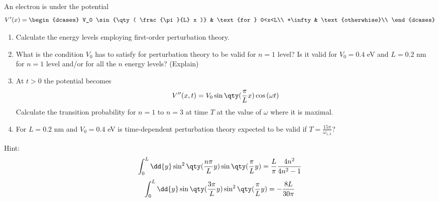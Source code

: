 \newpage
\setcounter{equation}{0}

\begin{esercizio}
   An electron is under the potential
   \begin{equation*}
      V'(x)=
      \begin{dcases}
         V_0 \sin{\qty( \frac{\pi}{L} x )} & \text{for } 0<x<L\\
         +\infty & \text{otherwhise}\\
      \end{dcases}
   \end{equation*}
   \begin{enumerate}[label=\alph*), leftmargin=0.6cm]
      \item Calculate the energy levels employing first-order perturbation theory.
      \item What is the condition $V_0$ has to satisfy for perturbation theory to be valid for $n=1$ level? Is it valid for $V_0=0.4$ eV and $L=0.2$ nm for $n=1$ level and/or for all the $n$ energy levels? (Explain)
      \item At $t>0$ the potential becomes
      \begin{equation*}
         V''(x,t)=V_0 \sin{\qty( \frac{\pi}{L} x )}\cos{(\omega t)}
      \end{equation*}
      Calculate the transition probability for $n=1$ to $n=3$ at time $T$ at the value of $\omega$ where it is maximal.
      \item For $L=0.2$ nm and $V_0=0.4$ eV is time-dependent perturbation theory expected to be valid if $T=\frac{15 \pi}{\omega_{1,3}}$?
   \end{enumerate}
   Hint:
   \begin{gather*}
      \int_{0}^{L} \dd{y} \sin^2{\qty( \frac{n\pi}{L} y )} \sin{\qty( \frac{\pi}{L} y )}
      =\frac{L}{\pi} \frac{4n^2}{4n^2 - 1}
      \\[0.1cm]
      \int_{0}^{L} \dd{y} \sin{\qty( \frac{3\pi}{L} y )} \sin^2{\qty( \frac{\pi}{L} y )}
      =-\frac{8 L}{30 \pi}
   \end{gather*}
\end{esercizio}
